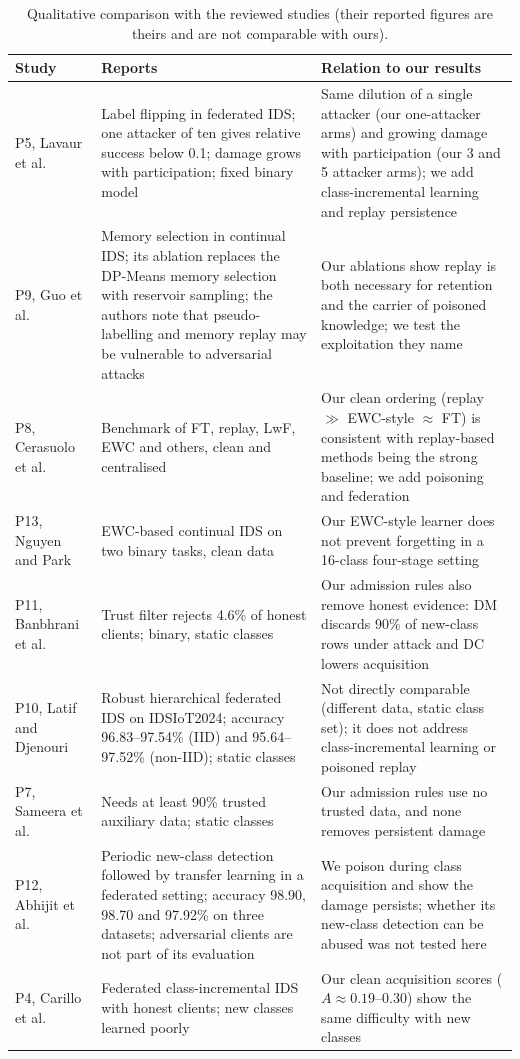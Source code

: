 \documentclass[10pt,a4paper]{article}
\begin{document}
\begin{table}[htbp]
\centering\footnotesize
\caption{Qualitative comparison with the reviewed studies (their reported figures are theirs and are not comparable with ours).}
\label{tab:lit}
\begin{tabularx}{\linewidth}{L{2.4cm}L{4.3cm}Y}
\toprule
Study & Reports & Relation to our results\\
\midrule
P5, Lavaur et al.\ \cite{lavaur} & Label flipping in federated IDS; one attacker of ten gives relative success below 0.1; damage grows with participation; fixed binary model & Same dilution of a single attacker (our one-attacker arms) and growing damage with participation (our 3 and 5 attacker arms); we add class-incremental learning and replay persistence\\
P9, Guo et al.\ \cite{guo} & Memory selection in continual IDS; its ablation replaces the DP-Means memory selection with reservoir sampling; the authors note that pseudo-labelling and memory replay may be vulnerable to adversarial attacks & Our ablations show replay is both necessary for retention and the carrier of poisoned knowledge; we test the exploitation they name\\
P8, Cerasuolo et al.\ \cite{cerasuolo} & Benchmark of FT, replay, LwF, EWC and others, clean and centralised & Our clean ordering (replay $\gg$ EWC-style $\approx$ FT) is consistent with replay-based methods being the strong baseline; we add poisoning and federation\\
P13, Nguyen and Park \cite{elgnn} & EWC-based continual IDS on two binary tasks, clean data & Our EWC-style learner does not prevent forgetting in a 16-class four-stage setting\\
P11, Banbhrani et al.\ \cite{flzt} & Trust filter rejects 4.6\% of honest clients; binary, static classes & Our admission rules also remove honest evidence: DM discards 90\% of new-class rows under attack and DC lowers acquisition\\
P10, Latif and Djenouri \cite{amm} & Robust hierarchical federated IDS on IDSIoT2024; accuracy 96.83--97.54\% (IID) and 95.64--97.52\% (non-IID); static classes & Not directly comparable (different data, static class set); it does not address class-incremental learning or poisoned replay\\
P7, Sameera et al.\ \cite{wei} & Needs at least 90\% trusted auxiliary data; static classes & Our admission rules use no trusted data, and none removes persistent damage\\
P12, Abhijit et al.\ \cite{rare} & Periodic new-class detection followed by transfer learning in a federated setting; accuracy 98.90, 98.70 and 97.92\% on three datasets; adversarial clients are not part of its evaluation & We poison during class acquisition and show the damage persists; whether its new-class detection can be abused was not tested here\\
P4, Carillo et al.\ \cite{carillo} & Federated class-incremental IDS with honest clients; new classes learned poorly & Our clean acquisition scores ($A\approx0.19$--$0.30$) show the same difficulty with new classes\\
\bottomrule
\end{tabularx}
\end{table}
\end{document}
